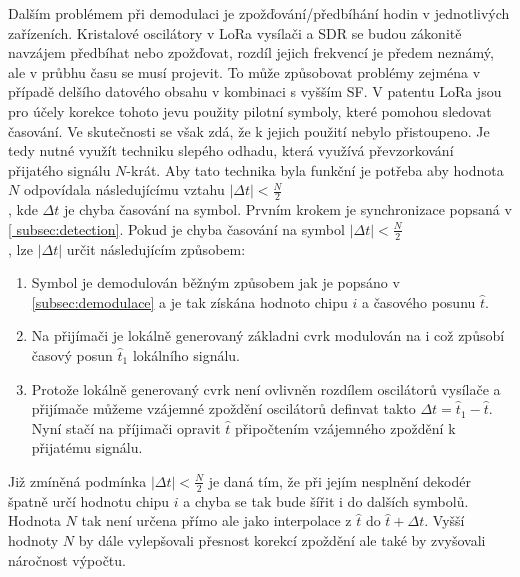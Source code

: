 \documentclass{ctuthesis}
\begin{document}
Dalším problémem při demodulaci je zpožďování/předbíhání hodin v jednotlivých zařízeních. Kristalové oscilátory v LoRa vysílači a SDR se budou zákonitě navzájem předbíhat nebo zpožďovat, rozdíl jejich frekvencí je předem neznámý, ale v průbhu času se musí projevit. To může způsobovat problémy zejména v případě delšího datového obsahu v kombinaci s vyšším SF. V patentu LoRa jsou pro účely korekce tohoto jevu použity pilotní symboly, které pomohou sledovat časování. Ve skutečnosti se však zdá, že k jejich použití nebylo přistoupeno. Je tedy nutné využít techniku slepého odhadu, která využívá převzorkování přijatého signálu $N$-krát. Aby tato technika byla funkční je potřeba aby hodnota $N$ odpovídala následujícímu vztahu $\lvert\Delta t \rvert < \frac{N}{2}$\\, kde $\Delta t$ je chyba časování na symbol.
Prvním krokem je synchronizace popsaná v \ref{ subsec:detection}. Pokud je chyba časování na symbol  $\lvert\Delta t \rvert < \frac{N}{2}$\\, lze $\lvert\Delta t \rvert$ určit následujícím způsobem:
\begin{enumerate}
\item
Symbol je demodulován běžným způsobem jak je popsáno v \ref{subsec:demodulace} a je tak získána hodnoto chipu $i$  a časového posunu $\hat{t}$.
\item
Na přijímači je lokálně generovaný základni cvrk modulován na i což způsobí časový posun $\hat{t}_1$ lokálního signálu.
\item
Protože lokálně generovaný cvrk není ovlivněn rozdílem oscilátorů vysílače a přijímače můžeme vzájemné zpoždění oscilátorů definvat takto $\Delta t = \hat{t}_1 - \hat{t}$. Nyní stačí na příjimači opravit $\hat{t}$ připočtením vzájemného zpoždění k přijatému signálu.
\end{enumerate}
Již zmíněná podmínka $\lvert\Delta t \rvert < \frac{N}{2}$ je daná tím, že při jejím nesplnění dekodér špatně určí hodnotu chipu $i$ a chyba se tak bude šířit i do dalších symbolů. Hodnota $N$ tak není určena přímo ale jako interpolace z $\hat{t}$ do $\hat{t} + \Delta t$. Vyšší hodnoty $N$ by dále vylepšovali přesnost korekcí zpoždění ale také by zvyšovali náročnost výpočtu.
\end{document}
